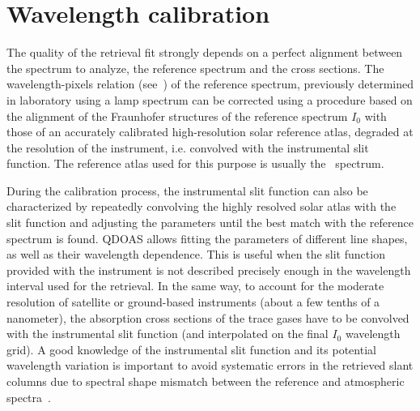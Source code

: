 \section{Wavelength calibration}\label{sec:wavel-calibr}
The quality of the retrieval fit strongly depends on a perfect
alignment between the spectrum to analyze, the reference spectrum and
the cross sections. The wavelength-pixels relation
(see~\citet{platt_2008}) of the %
reference spectrum, previously determined in laboratory using a lamp
spectrum %
can be corrected using a procedure based on the alignment of the
Fraunhofer structures of the reference spectrum $I_0$ with those of an
accurately calibrated high-resolution solar reference atlas, degraded
at the resolution of the instrument, i.e. convolved with the
instrumental slit function. The reference atlas used for this purpose
is usually the~\citet{Chance2010} spectrum.

During the calibration process, the instrumental slit function can
also be characterized by repeatedly convolving the highly resolved
solar atlas with the slit function and adjusting the parameters until
the best match with the reference spectrum is found.  QDOAS allows
fitting the parameters of different line shapes, as well as their
wavelength dependence.  This is useful when the slit function provided
with the instrument is not described precisely enough in the
wavelength interval used for the retrieval.  In the same way, to
account for the moderate resolution of satellite or ground-based
instruments (about a few tenths of a nanometer), the absorption cross
sections of the trace gases have to be convolved with the instrumental
slit function (and interpolated on the final $I_0$ wavelength grid). A
good knowledge of the instrumental slit function and its potential
wavelength variation is important to avoid systematic errors in the
retrieved slant columns due to spectral shape mismatch between the
reference and atmospheric spectra~\citep{vanroozendael2002}.

